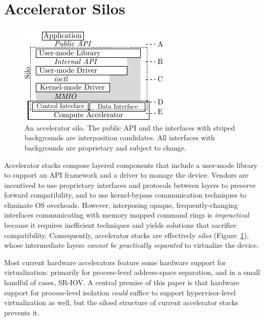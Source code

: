 \section{Accelerator Silos}
\label{s:silo}

\begin{figure}[!t]
	\centering
	\includegraphics[width=.78\linewidth]{ava/images/silo.pdf}
	\caption{An accelerator silo.
		The public API and the interfaces with striped backgrounds are interposition candidates.
		All interfaces with backgrounds are proprietary and subject to change.
        }
	\label{fig:silo}
\end{figure}

Accelerator stacks
compose layered components that include a user-mode library to support an
API framework and a driver to manage the device.
Vendors are incentived to use proprietary interfaces and protocols between layers to preserve forward compatibility,
and to use kernel-bypass communication techniques to eliminate OS overheads.
However, interposing opaque, frequently-changing interfaces communicating with memory
mapped command rings is \emph{impractical} because it requires inefficient techniques and
yields solutions that sacrifice compatibility.
Consequently, accelerator stacks are effectively \emph{silos}
(Figure~\ref{fig:silo}), whose intermediate layers
\emph{cannot be practically separated} to virtualize the device.

 Most current hardware accelerators feature some
hardware support for virtualization: primarily for process-level address-space
separation, and in a small handful of cases, SR-IOV.
A central premise of this paper is that hardware support for process-level
isolation \emph{could} suffice to support hypervisor-level virtualization as
well, but the siloed structure of current accelerator stacks prevents it.

